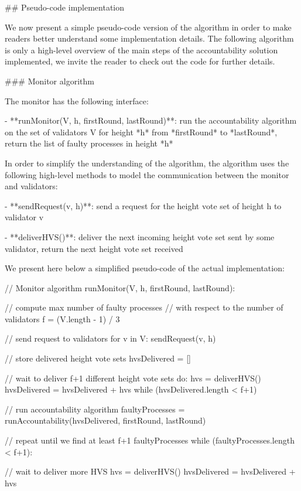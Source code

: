 \documentclass[a4paper,11pt,oneside]{report}
\begin{document}
\begin{markdown}
## Pseudo-code implementation

We now present a simple pseudo-code version of the algorithm in order to make readers better understand some implementation details.
The following algorithm is only a high-level overview of the main steps of the accountability solution implemented, we invite the reader to check out the code for further details.  

### Monitor algorithm

The monitor has the following interface:

- **runMonitor(V, h, firstRound, lastRound)**: run the accountability algorithm on the set of validators V for height *h* from *firstRound* to *lastRound*, return the list of faulty processes in height *h*

In order to simplify the understanding of the algorithm, the algorithm uses the following high-level methods to model the communication between the monitor and validators:

- **sendRequest(v, h)**: send a request for the height vote set of height h to validator v 

- **deliverHVS()**: deliver the next incoming height vote set sent by some validator, return the next height vote set received

We present here below a simplified pseudo-code of the actual  implementation:

    // Monitor algorithm
    runMonitor(V, h, firstRound, lastRound):
        
        // compute max number of faulty processes
        // with respect to the number of validators  
        f = (V.length - 1) / 3
        
        // send request to validators
        for v in V:
            sendRequest(v, h)
        
        // store delivered height vote sets
        hvsDelivered = []
        
        // wait to deliver f+1 different height vote sets
        do:
            hvs = deliverHVS()
            hvsDelivered = hvsDelivered + hvs
        while (hvsDelivered.length < f+1)
        
        // run accountability algorithm
        faultyProcesses = runAccountability(hvsDelivered, firstRound, lastRound)
        
        // repeat until we find at least f+1 faultyProcesses
        while (faultyProcesses.length < f+1):
        
            // wait to deliver more HVS
            hvs = deliverHVS()
            hvsDelivered = hvsDelivered + hvs
        

\end{markdown}
\end{document}
